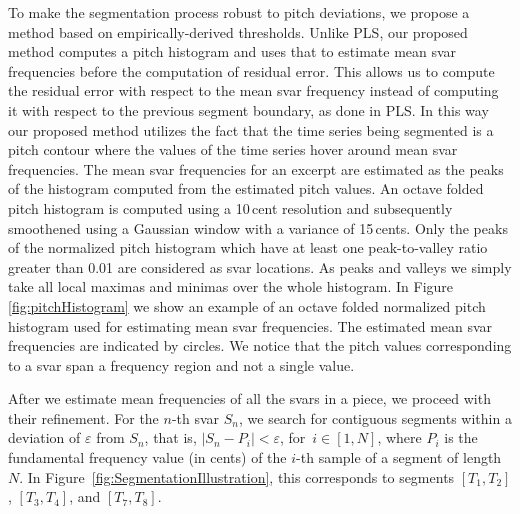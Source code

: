 To make the segmentation process robust to pitch deviations, we propose a method based on empirically-derived thresholds. Unlike PLS, our proposed method computes a pitch histogram and uses that to estimate mean svar frequencies before the computation of residual error. This allows us to compute the residual error with respect to the mean svar frequency instead of computing it with respect to the previous segment boundary, as done in PLS.  In this way our proposed method utilizes the fact that the time series being segmented is a pitch contour where the values of the time series hover around mean svar frequencies. The mean svar frequencies for an excerpt are estimated as the peaks of the histogram computed from the estimated pitch values. An octave folded pitch histogram is computed using a 10\,cent resolution and subsequently smoothened using a Gaussian window with a variance of 15\,cents. Only the peaks of the normalized pitch histogram which have at least one peak-to-valley ratio greater than 0.01 are considered as svar locations. As peaks and valleys we simply take all local maximas and minimas over the whole histogram. In Figure \ref{fig:pitchHistogram} we show an example of an octave folded normalized  pitch histogram used for estimating mean svar frequencies. The estimated mean svar frequencies are indicated by circles. We notice that the pitch values corresponding to a svar span a frequency region and not a single value.


After we estimate mean frequencies of all the svars in a piece, we proceed with their refinement. For the $n$-th svar $S_n$, we search for contiguous segments within a deviation of $\varepsilon$ from $S_n$, that is, $\vert S_n-P_i \vert < \varepsilon$, for~$i\in[1,N]$, where $P_i$ is the fundamental frequency value (in cents) of the $i$-th sample of a segment of length $N$. In Figure~\ref{fig:SegmentationIllustration}, this corresponds to segments $[T_1,T_2]$, $[T_3,T_4]$, and $[T_7,T_8]$.

